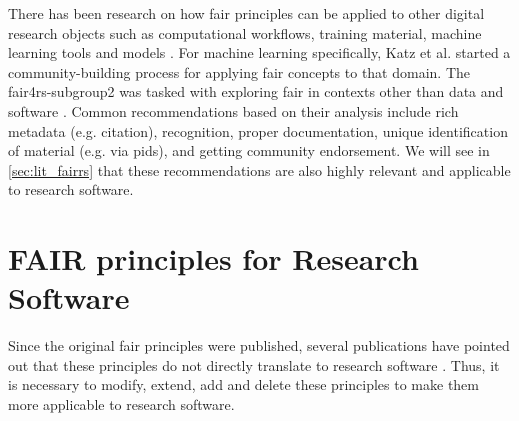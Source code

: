 There has been research on how \acrshort{fair} principles can be applied to other digital research objects such as computational workflows, training material, machine learning tools and models \cite{wolf_reusability_2021, garcia_ten_2020, katz_working_2021}. For machine learning specifically, Katz et al. \cite{katz_working_2021} started a community-building process for applying \acrshort{fair} concepts to that domain. The \acrshort{fair4rs}-subgroup2 was tasked with exploring \acrshort{fair} in contexts other than data and software \cite{kuzak_fair4rs_nodate}. Common recommendations based on their analysis include rich metadata (e.g. citation), recognition, proper documentation, unique identification of material (e.g. via \acrshort{pid}s), and getting community endorsement. We will see in \autoref{sec:lit_fairrs} that these recommendations are also highly relevant and applicable to research software.



\section{FAIR principles for Research Software}
\label{sec:lit_fairrs}
Since the original \acrshort{fair} principles were published, several publications have pointed out that these principles do not directly translate to research software \cite{gruenpeter_morane_m215_2020, hasselbring_fair_2020, lamprecht_towards_2020}. Thus, it is necessary to modify, extend, add and delete these principles to make them more applicable to research software.

